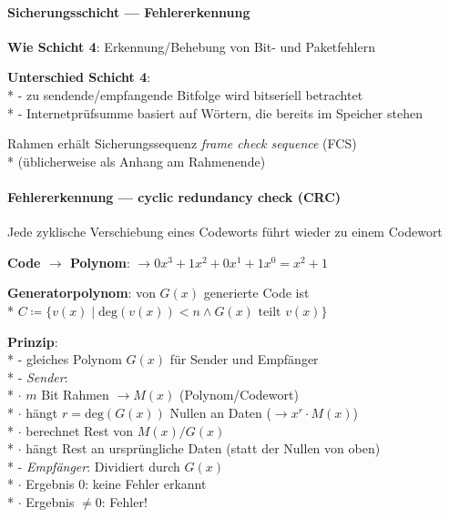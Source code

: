 \paragraph{Sicherungsschicht --- Fehlererkennung}
\begin{items}
  \item \textbf{Wie Schicht 4}: Erkennung/Behebung von Bit- und Paketfehlern
  \item \textbf{Unterschied Schicht 4}: \\*
    - zu sendende/empfangende Bitfolge wird bitseriell betrachtet \\*
    - Internetprüfsumme basiert auf Wörtern, die bereits im Speicher stehen
  \item Rahmen erhält Sicherungssequenz \emph{frame check sequence} (FCS) \\*
     (üblicherweise als Anhang am Rahmenende)
\end{items}

\paragraph{Fehlererkennung --- cyclic redundancy check (CRC)}
\begin{items}
	\item Jede zyklische Verschiebung eines Codeworts führt wieder zu einem Codewort
  \item \textbf{Code $\to$ Polynom}:  \( \to 0x^3+1x^2+0x^1+1x^0 = x^2+1 \)
  \item \textbf{Generatorpolynom}: von \( G(x) \) generierte Code ist \\*
    \( C \coloneqq \{ v(x) \mid \text{deg}(v(x)) < n \wedge G(x) \text{ teilt } v(x) \} \)
  \item \textbf{Prinzip}: \\*
    - gleiches Polynom \( G(x) \) für Sender und Empfänger \\*
    - \emph{Sender}: \\*
    \phantom{-} \( \cdot \)  \( m \) Bit Rahmen \( \to M(x) \) (Polynom/Codewort)\\*
    \phantom{-} \( \cdot \) hängt \( r = \text{deg}(G(x)) \) Nullen an Daten (\( \to x^r \cdot M(x) \))\\*
    \phantom{-} \( \cdot \) berechnet Rest von \( M(x)/G(x) \)\\*
    \phantom{-} \( \cdot \) hängt Rest an ursprüngliche Daten (statt der Nullen von oben) \\*
    - \emph{Empfänger}: Dividiert durch \( G(x) \) \\*
      \phantom{-} \( \cdot \) Ergebnis \( 0 \): keine Fehler erkannt \\*
      \phantom{-} \( \cdot \) Ergebnis \( \neq 0 \): Fehler!
\end{items}

